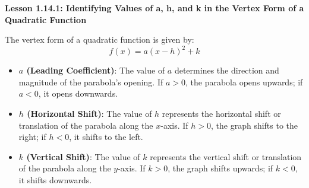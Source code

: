 \begin{center}
\textbf{Lesson 1.14.1: Identifying Values of a, h, and k in the Vertex Form of a Quadratic Function}
\end{center}


The vertex form of a quadratic function is given by:
\vspace*{-2ex}
\[ f(x) = a(x - h)^2 + k \]
\vspace*{-4ex}
\begin{itemize}
    \item \textbf{$a$ (Leading Coefficient)}: The value of $a$ determines the direction and magnitude of the parabola's opening. If $a > 0$, the parabola opens upwards; if $a < 0$, it opens downwards. 
    
    \item \textbf{$h$ (Horizontal Shift)}: The value of $h$ represents the horizontal shift or translation of the parabola along the $x$-axis. If $h > 0$, the graph shifts to the right; if $h < 0$, it shifts to the left. 
    
    \item \textbf{$k$ (Vertical Shift)}: The value of $k$ represents the vertical shift or translation of the parabola along the $y$-axis. If $k > 0$, the graph shifts upwards; if $k < 0$, it shifts downwards. 
\end{itemize}

